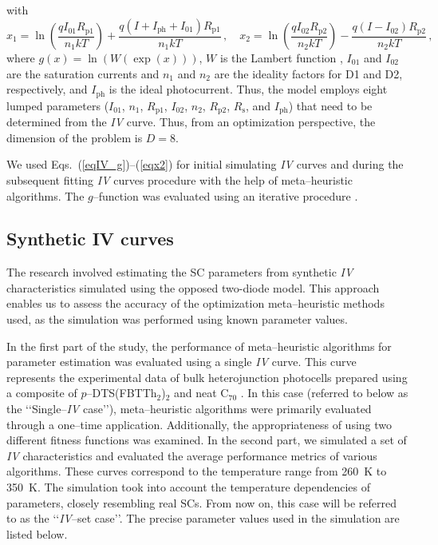 \documentclass[a4paper,fleqn]{cas-sc}
\begin{document}
with
\begin{equation}
\label{eqx2}
x_1= \ln\left(\frac{qI_{01}R_\mathrm{p1}}{n_1kT}\right)+\frac{q(I+I_\mathrm{ph}+I_{01})R_\mathrm{p1}}{n_1kT}\,,\quad
x_2= \ln\left(\frac{qI_{02}R_\mathrm{p2}}{n_2kT}\right)-\frac{q(I-I_{02})R_\mathrm{p2}}{n_2kT}\,,
\end{equation}
where
$g(x)=\ln(W(\exp(x)))$,
$W$ is the Lambert function \cite{LambertNew},
$I_{01}$ and $I_{02}$ are the saturation currents and
$n_1$ and $n_2$ are
the ideality factors for D1 and D2, respectively,
and $I_\mathrm{ph}$ is the ideal photocurrent.
Thus, the model employs eight lumped parameters
($I_{01}$, $n_1$, $R_\mathrm{p1}$, $I_{02}$, $n_2$, $R_\mathrm{p2}$,
$R_\mathrm{s}$, and $I_\mathrm{ph}$)
that need to be determined from the \emph{IV} curve.
Thus, from an optimization perspective, the dimension of the problem is $D=8$.

We used Eqs.~(\ref{eqIV_g})--(\ref{eqx2}) for initial simulating \emph{IV} curves 
and during the subsequent fitting \emph{IV} curves procedure with the help of meta--heuristic algorithms.
The $g$--function was evaluated using an iterative procedure \cite{roberts2015calculating}.



\subsection{Synthetic IV curves}\label{SynIV}

The research involved estimating the SC parameters from synthetic \emph{IV} characteristics simulated using the opposed two-diode model.
This approach enables us to assess the accuracy of the optimization meta--heuristic methods used, 
as the simulation was performed using known parameter values.


In the first part of the study, the performance of meta--heuristic algorithms for parameter estimation was evaluated using a single \emph{IV} curve.
This curve represents the experimental data of bulk heterojunction photocells prepared 
using a composite of $p$--DTS(FBTTh$_2$)$_2$ and neat C$_{70}$ \cite{Tada2015Organic}.
In this case (referred to below as the ‘‘Single--\emph{IV} case’’), meta--heuristic algorithms were primarily evaluated through a one--time application.
Additionally, the appropriateness of using two different fitness functions was examined.
In the second part, we simulated a set of \emph{IV} characteristics and evaluated the average performance metrics of various algorithms.
These curves correspond to the temperature range from 260~K to 350~K. 
The simulation took into account the temperature dependencies of parameters, closely resembling real SCs.
From now on, this case will be referred to as the ‘‘\emph{IV}--set case’’.
The precise parameter values used in the simulation are listed below.
\end{document}
